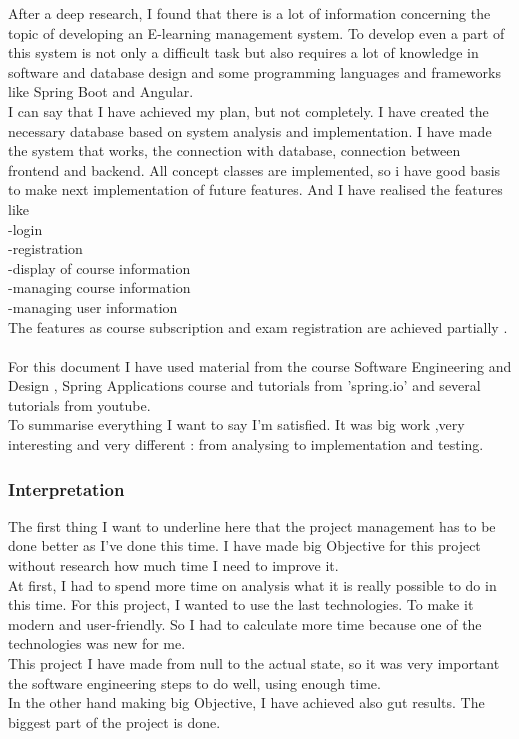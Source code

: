 \documentclass{scrartcl}
\begin{document}
After a deep research, I found that there is a lot of information concerning the topic of developing an E-learning management system. To develop even a part of this system is not only a difficult task but also requires a lot of knowledge in software and database design and some programming languages and frameworks like Spring Boot and Angular. \\
I can say that I have achieved my plan, but not completely. I have created the necessary database based on system analysis and implementation. I  have made the system that works, the connection with database, connection between frontend and backend. All concept classes are implemented, so i have good basis to make next implementation of future features.  And I have realised the features like \\
-login\\
-registration\\
-display of course information\\
-managing course information\\
-managing user information \\
The features as course subscription and exam registration are achieved partially .\\
\\ For this document I have used material from the course Software Engineering and Design \cite{sed}, Spring Applications course \cite{sf} and tutorials from 'spring.io' \cite{spring-tut} and several tutorials from youtube.\\
To summarise everything I want to say I'm satisfied. It was big work ,very interesting and very different : from analysing to implementation and testing.

 

\subsubsection{Interpretation }

The first thing I want to underline here that the project management has to be done better as I've done this time. I have made big Objective for this project without research how much time I need to improve it.\\
At first, I had to spend more time on analysis what it is really possible to do in this time. For this project, I wanted to use the last technologies. To make it modern and user-friendly. So I had to calculate more time because one of the technologies was new for me. \\
This project I have made from null to the actual state, so it was very important the software engineering steps to do well, using enough time.\\
In the other hand making big Objective, I have achieved also gut results. The biggest part of the project is done.
\end{document}
